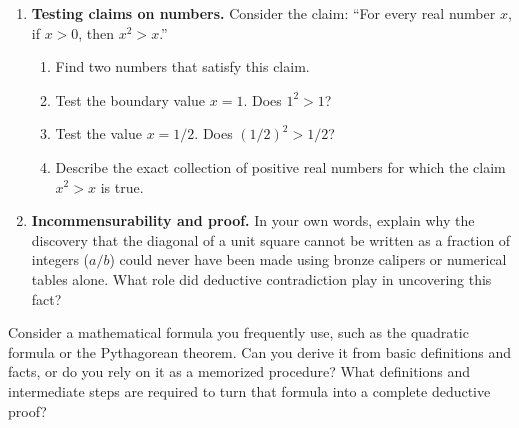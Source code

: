 \begin{enumerate}
\item \textbf{Testing claims on numbers.} Consider the claim: ``For every real number $x$, if $x > 0$, then $x^2 > x$.''
\begin{enumerate}[label=(\alph*)]
\item Find two numbers that satisfy this claim.
\item Test the boundary value $x = 1$. Does $1^2 > 1$?
\item Test the value $x = 1/2$. Does $(1/2)^2 > 1/2$?
\item Describe the exact collection of positive real numbers for which the claim $x^2 > x$ is true.
\end{enumerate}

\item \textbf{Incommensurability and proof.} In your own words, explain why the discovery that the diagonal of a unit square cannot be written as a fraction of integers ($a/b$) could never have been made using bronze calipers or numerical tables alone. What role did deductive contradiction play in uncovering this fact?
\end{enumerate}

\begin{walkbox}
Consider a mathematical formula you frequently use, such as the quadratic formula or the Pythagorean theorem. Can you derive it from basic definitions and facts, or do you rely on it as a memorized procedure? What definitions and intermediate steps are required to turn that formula into a complete deductive proof?
\end{walkbox}

\newpage
